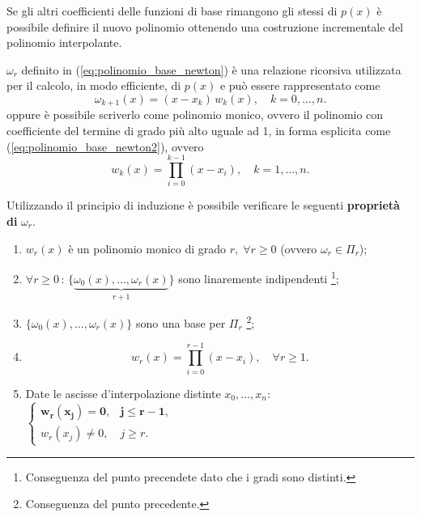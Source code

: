 
Se gli altri coefficienti delle funzioni di base rimangono gli stessi di $p(x)$ è possibile definire il nuovo polinomio ottenendo una costruzione incrementale del polinomio interpolante.

\begin{remark}
	$\omega_r$ definito in (\ref{eq:polinomio_base_newton}) è una relazione ricorsiva utilizzata per il calcolo, in modo efficiente, di $p(x)$ e può essere rappresentato come
	\begin{equation*}
	    \omega_{k+1}(x)=(x-x_k)\, w_k(x),\quad k=0,\hdots, n.
	\end{equation*}
	oppure è possibile scriverlo come \gls{polinomio monico}, ovvero il polinomio con coefficiente del termine di grado più alto uguale ad 1, in forma esplicita come (\ref{eq:polinomio_base_newton2}), ovvero
	\begin{equation*}
		w_k(x)=\prod_{i=0}^{k-1}(x-x_i),\quad k=1,\hdots,n.
	\end{equation*}
\end{remark}

Utilizzando il principio di induzione è possibile verificare le seguenti \textbf{proprietà di} $\omega_r$.
\begin{property}
	\begin{enumerate}
	    \item $w_r(x)$ è un \gls{polinomio monico} di grado $r,\; \forall r\geq 0$ (ovvero $\omega_r\in\Pi_r$);
	    \item $\forall r\geq 0 \, :\, \{\underbrace{\omega_0(x), \hdots, \omega_r(x)}_{r+1}\}$ sono linaremente indipendenti \footnote{Conseguenza del punto precendete dato che i gradi sono distinti.};
	    \item $\{\omega_0(x),\hdots,\omega_r(x)\}$ sono una base per $\Pi_r$ \footnote{Conseguenza del punto precedente.};
	    \item
	    \begin{equation}\label{eq:polinomio_base_newton2}
	    	w_r(x)=\prod_{i=0}^{r-1}(x-x_i),\quad \forall r\geq 1.
	    \end{equation}
	    \item Date le ascisse d'interpolazione distinte $x_0, \hdots, x_n$:
	        $\begin{cases}
	        \boldsymbol{w_r(x_j)=0}, & \boldsymbol{j\leq r-1},\\
	        w_r(x_j)\neq 0, & j\geq r.
	        \end{cases}$
	\end{enumerate}
\end{property}


